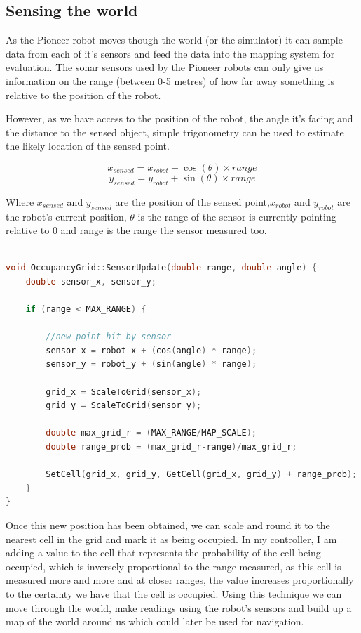 \documentclass{article}
\begin{document}
\subsection{Sensing the world}
As the Pioneer robot moves though the world (or the simulator) it can sample data from each of it's sensors and feed the data into the mapping system for evaluation. The sonar sensors used by the Pioneer robots can only give us information on the range (between 0-5 metres) of how far away something is relative to the position of the robot.

However, as we have access to the position of the robot, the angle it's facing and the distance to the sensed object, simple trigonometry can be used to estimate the likely location of the sensed point.

\[ x_{sensed} = x_{robot} + \cos (\theta) \times range \]
\[ y_{sensed} = y_{robot} + \sin (\theta) \times range \]

Where $x_{sensed}$ and $y_{sensed}$ are the position of the sensed point,$x_{robot}$ and $y_{robot}$ are the robot's current position, $\theta$ is the range of the sensor is currently pointing relative to 0 and range is the range the sensor measured too.

\begin{center}
	\begin{lstlisting}[language=c++, showstringspaces=false, caption={C++ code used for calculating the new point given the current position, angle and range}]

void OccupancyGrid::SensorUpdate(double range, double angle) {
	double sensor_x, sensor_y;

	if (range < MAX_RANGE) {

		//new point hit by sensor
		sensor_x = robot_x + (cos(angle) * range);
		sensor_y = robot_y + (sin(angle) * range);

		grid_x = ScaleToGrid(sensor_x);
		grid_y = ScaleToGrid(sensor_y);

		double max_grid_r = (MAX_RANGE/MAP_SCALE);
		double range_prob = (max_grid_r-range)/max_grid_r;

		SetCell(grid_x, grid_y, GetCell(grid_x, grid_y) + range_prob);
	}
}

	\end{lstlisting}
\end{center}

Once this new position has been obtained, we can scale and round it to the nearest cell in the grid and mark it as being occupied. In my controller, I am adding a value to the cell that represents the probability of the cell being occupied, which is inversely proportional to the range measured, as this cell is measured more and more and at closer ranges, the value increases proportionally to the certainty we have that the cell is occupied. Using this technique we can move through the world, make readings using the robot's sensors and build up a map of the world around us which could later be used for navigation.
\end{document}
